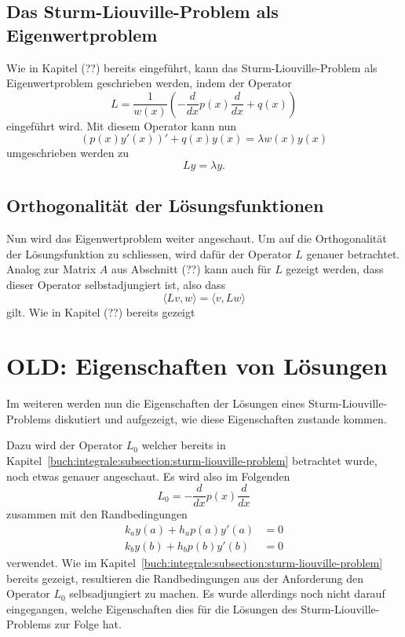 \subsection{Das Sturm-Liouville-Problem als Eigenwertproblem}


Wie in Kapitel (??) bereits eingeführt, kann das Sturm-Liouville-Problem als
Eigenwertproblem geschrieben werden, indem der Operator
\[
    L
    =
    \frac{1}{w(x)}\left( -\frac{d}{dx}p(x) \frac{d}{dx} + q(x)\right)
\]
eingeführt wird.
Mit diesem Operator kann nun
\[
    (p(x)y'(x))' + q(x)y(x)
    =
    \lambda w(x) y(x)
\]
umgeschrieben werden zu
\[
    L y
    =
    \lambda y.
\]

\subsection{Orthogonalität der Lösungsfunktionen}

Nun wird das Eigenwertproblem weiter angeschaut.
Um auf die Orthogonalität der Lösungsfunktion zu schliessen, wird dafür der
Operator $L$ genauer betrachtet.
Analog zur Matrix $A$ aus Abschnitt (??) kann auch für $L$ gezeigt werden,
dass dieser Operator selbstadjungiert ist, also dass
\[
    \langle L v, w\rangle
    =
    \langle v, L w\rangle
\]
gilt.
Wie in Kapitel (??) bereits gezeigt 


\iffalse

\section{OLD: Eigenschaften von Lösungen
}

Im weiteren werden nun die Eigenschaften der Lösungen eines
Sturm-Liouville-Problems diskutiert und aufgezeigt, wie diese Eigenschaften
zustande kommen.

Dazu wird der Operator $L_0$ welcher bereits in
Kapitel~\ref{buch:integrale:subsection:sturm-liouville-problem} betrachtet
wurde, noch etwas genauer angeschaut.
Es wird also im Folgenden
\[
    L_0
    =
    -\frac{d}{dx}p(x)\frac{d}{dx}
\]
zusammen mit den Randbedingungen
\[
    \begin{aligned}
        k_a y(a) + h_a p(a) y'(a) &= 0 \\
        k_b y(b) + h_b p(b) y'(b) &= 0
    \end{aligned}
\]
verwendet.
Wie im Kapitel~\ref{buch:integrale:subsection:sturm-liouville-problem} bereits 
gezeigt, resultieren die Randbedingungen aus der Anforderung den Operator $L_0$
selbsadjungiert zu machen.
Es wurde allerdings noch nicht darauf eingegangen, welche Eigenschaften dies
für die Lösungen des Sturm-Liouville-Problems zur Folge hat.

